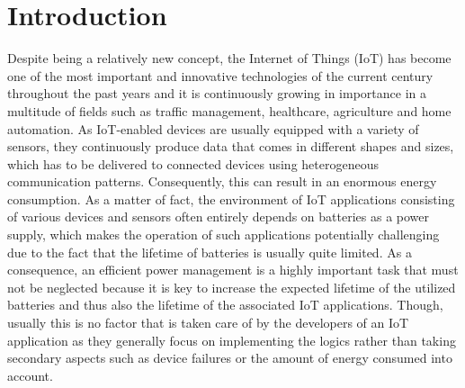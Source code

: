 
\chapter{Introduction}\label{chapter:introduction}
Despite being a relatively new concept, the Internet of Things (IoT) has become one of the most important and innovative technologies of the current century throughout the past years and it is continuously growing in importance in a multitude of fields such as traffic management, healthcare, agriculture and home automation. As IoT-enabled devices are usually equipped with a variety of sensors, they continuously produce data that comes in different shapes and sizes, which has to be delivered to connected devices using heterogeneous communication patterns. Consequently, this can result in an enormous energy consumption. As a matter of fact, the environment of IoT applications consisting of various devices and sensors often entirely depends on batteries as a power supply, which makes the operation of such applications potentially challenging due to the fact that the lifetime of batteries is usually quite limited. As a consequence, an efficient power management is a highly important task that must not be neglected because it is key to increase the expected lifetime of the utilized batteries and thus also the lifetime of the associated IoT applications. Though, usually this is no factor that is taken care of by the developers of an IoT application as they generally focus on implementing the logics rather than taking secondary aspects such as device failures or the amount of energy consumed into account.

